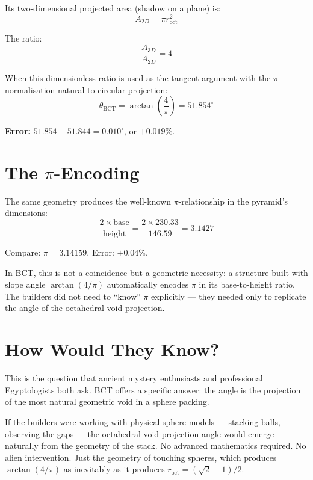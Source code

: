\documentclass[aps,prl,twocolumn,superscriptaddress]{revtex4-2}
\begin{document}
Its two-dimensional projected area (shadow on a plane) is:
\begin{equation}
A_{2D} = \pi r_{\mathrm{oct}}^2
\end{equation}

The ratio:
\begin{equation}
\frac{A_{3D}}{A_{2D}} = 4
\end{equation}

When this dimensionless ratio is used as the tangent argument with the $\pi$-normalisation natural to circular projection:
\begin{equation}
\theta_{\mathrm{BCT}} = \arctan\left(\frac{4}{\pi}\right) = 51.854^\circ
\end{equation}

\textbf{Error:} $51.854 - 51.844 = 0.010^\circ$, or $+0.019\%$.

\section{The $\pi$-Encoding}

The same geometry produces the well-known $\pi$-relationship in the pyramid's dimensions:
\begin{equation}
\frac{2 \times \text{base}}{\text{height}} = \frac{2 \times 230.33}{146.59} = 3.1427
\end{equation}

Compare: $\pi = 3.14159$. Error: $+0.04\%$.

In BCT, this is not a coincidence but a geometric necessity: a structure built with slope angle $\arctan(4/\pi)$ automatically encodes $\pi$ in its base-to-height ratio. The builders did not need to ``know'' $\pi$ explicitly --- they needed only to replicate the angle of the octahedral void projection.

\section{How Would They Know?}

This is the question that ancient mystery enthusiasts and professional Egyptologists both ask. BCT offers a specific answer: the angle is the projection of the most natural geometric void in a sphere packing.

If the builders were working with physical sphere models --- stacking balls, observing the gaps --- the octahedral void projection angle would emerge naturally from the geometry of the stack. No advanced mathematics required. No alien intervention. Just the geometry of touching spheres, which produces $\arctan(4/\pi)$ as inevitably as it produces $r_{\mathrm{oct}} = (\sqrt{2}-1)/2$.
\end{document}
